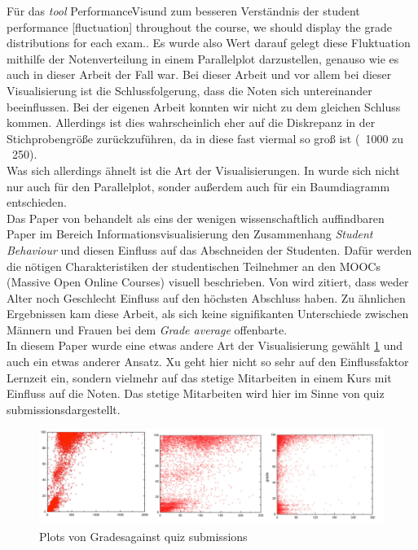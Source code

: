 \documentclass[usegeometry=true]{scrartcl}
\begin{document}
\noindent Für das \textit{tool} \glqq PerformanceVis\grqq und zum besseren Verständnis der \glqq student performance [fluctuation] throughout the course, we should display the grade distributions for each exam.\grqq  \cite{Deng19}. Es wurde also Wert darauf gelegt diese Fluktuation mithilfe der Notenverteilung in einem Parallelplot darzustellen, genauso wie es auch in dieser Arbeit der Fall war. Bei dieser Arbeit und vor allem bei dieser Visualisierung ist die Schlussfolgerung, dass die Noten sich untereinander beeinflussen. Bei der eigenen Arbeit konnten wir nicht zu dem gleichen Schluss kommen. Allerdings ist dies wahrscheinlich eher auf die Diskrepanz in der Stichprobengröße zurückzuführen, da in \cite{Deng19} diese fast viermal so groß ist (~1000 zu ~250).\\
Was sich allerdings ähnelt ist die Art der Visualisierungen. In \cite{Deng19} wurde sich nicht nur auch für den Parallelplot, sonder außerdem auch für ein Baumdiagramm entschieden.\\


\noindent Das Paper von \cite{Xu14} behandelt als eins der wenigen wissenschaftlich auffindbaren Paper im Bereich Informationsvisualisierung den Zusammenhang \textit{Student Behaviour} und diesen Einfluss auf das Abschneiden der Studenten. Dafür werden die nötigen Charakteristiken der studentischen Teilnehmer an den MOOCs (Massive Open Online Courses) visuell beschrieben. Von \cite{Xu14} wird zitiert, dass weder Alter noch Geschlecht Einfluss auf den höchsten Abschluss haben. Zu ähnlichen Ergebnissen kam diese Arbeit, als sich keine signifikanten Unterschiede zwischen Männern und Frauen bei dem \textit{Grade average} offenbarte.\\

\noindent In diesem Paper wurde eine etwas andere Art der Visualisierung gewählt \ref{Quelle2} und auch ein etwas anderer Ansatz. Xu geht hier nicht so sehr auf den Einflussfaktor Lernzeit ein, sondern vielmehr auf das stetige Mitarbeiten in einem Kurs mit Einfluss auf die Noten. Das stetige Mitarbeiten wird hier im Sinne von \glqq quiz submissions\grqq dargestellt.\\



\begin{figure}[h]
\begin{center}
	\includegraphics[scale=.3]{Quelle2.png}
	\caption{Plots von \glqq Grades\grqq against \glqq quiz submissions\grqq}
	\label{Quelle2}
\end{center}
\end{figure}
\end{document}
